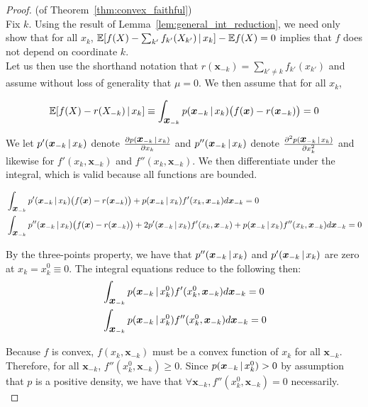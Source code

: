 \begin{proof} (of Theorem~\ref{thm:convex_faithful})\\
Fix $k$. Using the result of Lemma~\ref{lem:general_int_reduction}, we need only show that for all $x_k$, $ {\mathbb E}[ f(X) - \sum_{k'} f_{k'}(X_{k'}) {\,|\,} x_k] - {\mathbb E} f(X) = 0 $ implies that $f$ does not depend on coordinate $k$.\\

Let us then use the shorthand notation that $r(\mathbf{x}_{-k}) = \sum_{k' \neq k} f_{k'}(x_{k'})$ and assume without loss of generality that $\mu = 0$. We then assume that for all $x_k$, 

\[
 {\mathbb E}[ f(X) - r(X_{-k})  {\,|\,} x_k] \equiv 
 \int_{\mbox{\boldmath $x$}_{-k}}  p(\mbox{\boldmath $x$}_{-k} {\,|\,} x_k ) 
 \big(f(\mbox{\boldmath $x$}) - r(\mbox{\boldmath $x$}_{-k}) \big) = 0
\]

We let $p'(\mbox{\boldmath $x$}_{-k} {\,|\,} x_k)$ denote 
$\frac{\partial p(\mbox{\boldmath $x$}_{-k} {\,|\,} x_k)}{\partial x_k}$ and 
$p''(\mbox{\boldmath $x$}_{-k} {\,|\,} x_k)$ denote 
$\frac{\partial^2 p(\mbox{\boldmath $x$}_{-k} {\,|\,} x_k)}{\partial x_k^2}$ and likewise for $f'(x_k, \mathbf{x}_{-k})$ and $f''(x_k, \mathbf{x}_{-k})$. We then differentiate under the integral, which is valid because all functions are bounded.

\begin{align}
& \int_{\mbox{\boldmath $x$}_{-k}} p'(\mbox{\boldmath $x$}_{-k} {\,|\,} x_k) 
\big( f(\mbox{\boldmath $x$}) - r(\mbox{\boldmath $x$}_{-k}) \big) + 
p(\mbox{\boldmath $x$}_{-k} {\,|\,} x_k) f'(x_k, \mbox{\boldmath $x$}_{-k}) d \mbox{\boldmath $x$}_{-k}  = 0 
\label{eqn:integral1a} \\
& \int_{\mbox{\boldmath $x$}_{-k}} p''(\mbox{\boldmath $x$}_{-k} {\,|\,} x_k) 
\big( f(\mbox{\boldmath $x$}) - r(\mbox{\boldmath $x$}_{-k}) \big)  + 
2 p'(\mbox{\boldmath $x$}_{-k} {\,|\,} x_k) f'(x_k, \mbox{\boldmath $x$}_{-k}) +
p(\mbox{\boldmath $x$}_{-k} {\,|\,} x_k) f''(x_k, \mbox{\boldmath $x$}_{-k}) d\mbox{\boldmath $x$}_{-k}  = 0 
\end{align}

By the three-points property, we have that $p''(\mbox{\boldmath $x$}_{-k} {\,|\,} x_k)$ and $p'(\mbox{\boldmath $x$}_{-k} {\,|\,} x_k)$ are zero at $x_k = x_k^0 \equiv 0$. The integral equations reduce to the following then:
\begin{align}
& \int_{\mbox{\boldmath $x$}_{-k}} p(\mbox{\boldmath $x$}_{-k} {\,|\,} x^0_k) f'(x^0_k, \mbox{\boldmath $x$}_{-k}) d \mbox{\boldmath $x$}_{-k}= 0 \label{eqn:integral1b} \\
& \int_{\mbox{\boldmath $x$}_{-k}} p(\mbox{\boldmath $x$}_{-k} {\,|\,} x^0_k) f''(x^0_k, \mbox{\boldmath $x$}_{-k}) d\mbox{\boldmath $x$}_{-k} = 0
\end{align}

Because $f$ is convex, $f(x_k, \mathbf{x}_{-k})$ must be a convex function of $x_k$ for all $\mathbf{x}_{-k}$. Therefore, for all $\mathbf{x}_{-k}$, $f''(x^0_k, \mathbf{x}_{-k}) \geq 0$. Since $p(\mbox{\boldmath $x$}_{-k} {\,|\,} x^0_k) > 0$ by assumption that $p$ is a positive density, we have that $\forall \mathbf{x}_{-k}, f''(x^0_k, \mathbf{x}_{-k}) = 0$ necessarily.\\


\end{proof}
